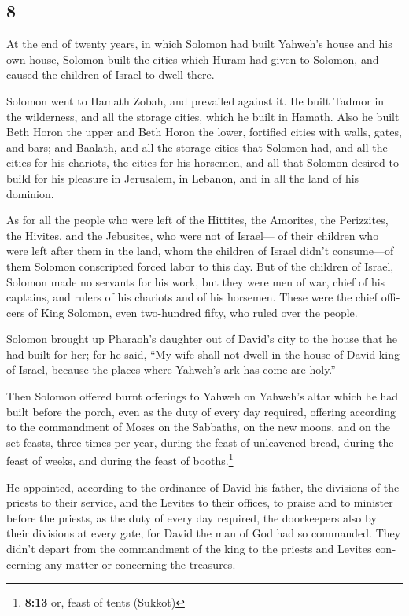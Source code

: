 \begin{paracol}{2}
\begin{otherlanguage}{english}
{\section{8}\label{section-15}}

 At the end of twenty years, in which Solomon had built
Yahweh's house and his own house,  Solomon built the
cities which Huram had given to Solomon, and caused the children of
Israel to dwell there.

 Solomon went to Hamath Zobah, and prevailed against it.
 He built Tadmor in the wilderness, and all the storage
cities, which he built in Hamath.  Also he built Beth
Horon the upper and Beth Horon the lower, fortified cities with walls,
gates, and bars;  and Baalath, and all the storage cities
that Solomon had, and all the cities for his chariots, the cities for
his horsemen, and all that Solomon desired to build for his pleasure in
Jerusalem, in Lebanon, and in all the land of his dominion.

 As for all the people who were left of the Hittites, the
Amorites, the Perizzites, the Hivites, and the Jebusites, who were not
of Israel---  of their children who were left after them
in the land, whom the children of Israel didn't consume---of them
Solomon conscripted forced labor to this day.  But of the
children of Israel, Solomon made no servants for his work, but they were
men of war, chief of his captains, and rulers of his chariots and of his
horsemen.  These were the chief officers of King Solomon,
even two-hundred fifty, who ruled over the people.

 Solomon brought up Pharaoh's daughter out of David's
city to the house that he had built for her; for he said, ``My wife
shall not dwell in the house of David king of Israel, because the places
where Yahweh's ark has come are holy.''

 Then Solomon offered burnt offerings to Yahweh on
Yahweh's altar which he had built before the porch,  even
as the duty of every day required, offering according to the commandment
of Moses on the Sabbaths, on the new moons, and on the set feasts, three
times per year, during the feast of unleavened bread, during the feast
of weeks, and during the feast of booths.\footnote{\textbf{8:13} or,
  feast of tents (Sukkot)}

 He appointed, according to the ordinance of David his
father, the divisions of the priests to their service, and the Levites
to their offices, to praise and to minister before the priests, as the
duty of every day required, the doorkeepers also by their divisions at
every gate, for David the man of God had so commanded. 
They didn't depart from the commandment of the king to the priests and
Levites concerning any matter or concerning the treasures.


\end{otherlanguage}
\end{paracol}
